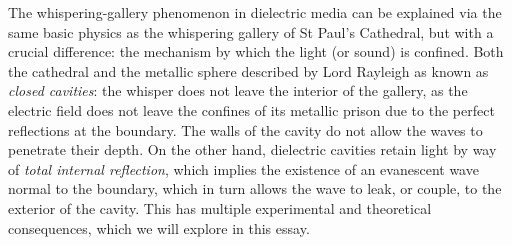 The whispering-gallery phenomenon in dielectric media can be explained
via the same basic physics as the whispering gallery of St Paul's Cathedral, 
but with a crucial difference: the mechanism by which the light (or sound) is confined.
Both the cathedral and the metallic sphere described by Lord Rayleigh as known as 
\textit{closed cavities}: the whisper does not leave the interior of the gallery,
as the electric field does not leave the confines of its metallic prison due to the perfect
reflections at the boundary. The walls of the cavity do not allow the waves to penetrate their depth. 
On the other hand, dielectric cavities retain light by way of \textit{total internal reflection}, which
implies the existence of an evanescent wave normal to the boundary, which in turn
allows the wave to leak, or couple, to the exterior of the cavity. This has multiple
experimental and theoretical consequences, which we will explore in this essay.


